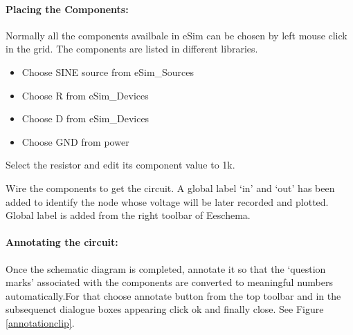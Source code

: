 \paragraph{Placing the Components:} Normally all the components availbale in eSim can be chosen by left mouse click in the grid. The components are listed in different libraries. %


\begin{itemize}
\item
Choose SINE source from eSim\_Sources
\item
Choose R from eSim\_Devices
\item
Choose D from eSim\_Devices
\item
Choose GND from power
\end{itemize}

Select the resistor and edit its component value to 1k.%


Wire the components to get the circuit. A global label `in'  and `out' has been added to identify the node whose voltage will be later recorded and plotted. Global label is added from the right toolbar of Eeschema.

\paragraph{Annotating the circuit:} Once the schematic diagram is completed, annotate it so that the `question marks' associated with the components are converted to meaningful numbers automatically.For that choose annotate button from the top toolbar and in the subsequenct dialogue boxes appearing click ok and finally close. See Figure \ref{annotationclip}.




